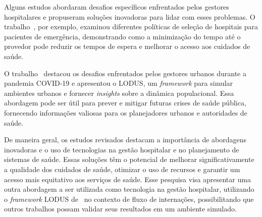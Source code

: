 Alguns estudos abordaram desafios específicos enfrentados pelos gestores hospitalares e propuseram soluções inovadoras para lidar com esses problemas. O trabalho~\cite{10.1145/3587889.3587893}, por exemplo, examinou diferentes políticas de seleção de hospitais para pacientes de emergência, demonstrando como a minimização do tempo até o provedor pode reduzir os tempos de espera e melhorar o acesso aos cuidados de saúde.

O trabalho~\cite{9239083} destacou os desafios enfrentados pelos gestores urbanos durante a pandemia COVID-19 e apresentou o LODUS, um \textit{framework} para simular ambientes urbanos e fornecer \textit{insights} sobre a dinâmica populacional. Essa abordagem pode ser útil para prever e mitigar futuras crises de saúde pública, fornecendo informações valiosas para os planejadores urbanos e autoridades de saúde.

De maneira geral, os estudos revisados destacam a importância de abordagens inovadoras e o uso de tecnologias na gestão hospitalar e no planejamento de sistemas de saúde. Essas soluções têm o potencial de melhorar significativamente a qualidade dos cuidados de saúde, otimizar o uso de recursos e garantir um acesso mais equitativo aos serviços de saúde. Esse pesquisa visa apresentar uma outra abordagem a ser utilizada como tecnologia na gestão hospitalar, utilizando o \textit{framework} LODUS de~\cite{9239083} no contexto de fluxo de internações, possibilitando que outros trabalhos possam validar seus resultados em um ambiente simulado.
